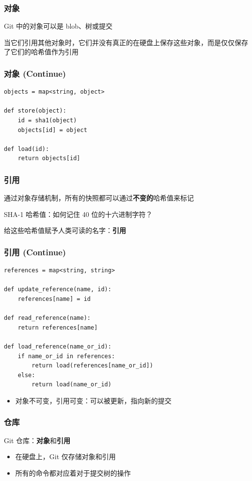 \documentclass[UTF8, 16pt]{beamer}
\begin{document}
\begin{frame}
    \frametitle{对象}
    \textcolor{sufered}{Git 中的对象可以是 blob、树或提交}

    当它们引用其他对象时，它们并没有真正的在硬盘上保存这些对象，而是仅仅保存了它们的哈希值作为引用
\end{frame}

\begin{frame}[fragile]
    \frametitle{对象 (Continue)}
    \begin{lstlisting}
objects = map<string, object>

def store(object):
    id = sha1(object)
    objects[id] = object

def load(id):
    return objects[id]
    \end{lstlisting}
\end{frame}

\begin{frame}
    \frametitle{引用}
    通过对象存储机制，所有的快照都可以通过\textbf{不变的}哈希值来标记

    SHA-1 哈希值：如何记住 40 位的十六进制字符？

    \textcolor{sufered}{给这些哈希值赋予人类可读的名字：\textbf{引用}}
\end{frame}

\begin{frame}[fragile]
    \frametitle{引用 (Continue)}
    \begin{lstlisting}
references = map<string, string>

def update_reference(name, id):
    references[name] = id

def read_reference(name):
    return references[name]

def load_reference(name_or_id):
    if name_or_id in references:
        return load(references[name_or_id])
    else:
        return load(name_or_id)
    \end{lstlisting}

    \begin{itemize}
        \item 对象不可变，引用可变：可以被更新，指向新的提交
    \end{itemize}
\end{frame}

\begin{frame}
    \frametitle{仓库}
    \textcolor{sufered}{Git 仓库：\textbf{对象}和\textbf{引用}}

    \begin{itemize}
        \item 在硬盘上，Git 仅存储对象和引用
        \item 所有的命令都对应着对于提交树的操作
    \end{itemize}
\end{frame}
\end{document}
